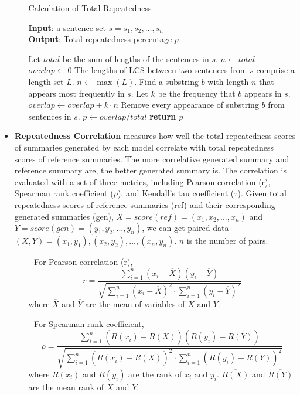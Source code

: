 \begin{itemize}
\begin{itemize}
\begin{algorithm}[th]
\caption{Calculation of Total Repeatedness}
\small
\label{alg:red}
\textbf{Input}: a sentence set $s = {s_{1}, s_{2},...,s_{n}}$\\
\textbf{Output}: Total repeatedness percentage $p$
\begin{algorithmic}[1] 
\STATE Let $total$ be the sum of lengths of the sentences in $s$.
\STATE $n \leftarrow total$
\STATE $overlap \leftarrow 0$
\STATE The lengths of LCS between two sentences from $s$ comprise a length set $L$.
\STATE $n \leftarrow \max(L)$.
\STATE Find a substring $b$ with length $n$ that appears most frequently in $s$.
\STATE Let $k$ be the frequency that $b$ appears in $s$.
\STATE $overlap \leftarrow overlap + k\cdot n$
\STATE Remove every appearance of substring $b$ from sentences in $s$.
\ENDWHILE
\STATE $p \leftarrow overlap/total$
\STATE \textbf{return $p$} 
\end{algorithmic}
\end{algorithm}
\end{itemize}

\item \textbf{Repeatedness Correlation} 
measures how well 
the total repeatedness scores of summaries generated by each model
correlate with total repeatedness scores of reference summaries. 
The more correlative generated summary and reference summary are,
the better generated summary is.
The correlation is evaluated with a set of
three metrics, including Pearson correlation (r),
Spearman rank coefficient ($\rho$), and Kendall's tau coefficient ($\tau$).
Given total repeatedness scores of reference summaries (ref) and 
their corresponding generated summaries (gen),
$X=score(ref)=(x_1, x_2,..., x_n)$ and 
$Y=score(gen)=(y_1, y_2,..., y_n)$, 
we can get paired data $(X,Y)={(x_1, y_1), (x_2, y_2),..., (x_n, y_n)}$.
$n$ is the number of pairs.
\begin{itemize}	
\item[-] For Pearson correlation (r),
\begin{equation}
r = \frac{\sum_{i=1}^{n}(x_i - \overline{X})(y_i - \overline{Y})}
	{\sqrt{\sum_{i=1}^{n}(x_i - \overline{X})^{2}\cdot\sum_{i=1}^{n}(y_i - \overline{Y})^{2}}}
\end{equation}
where $\overline{X}$ and $\overline{Y}$ are the mean of variables of $X$ and $Y$.

\item[-] For Spearman rank coefficient,
\begin{equation}
\rho = \frac{\sum_{i=1}^{n}(R(x_i) - \overline{R(X)})(R(y_i) - \overline{R(Y)})}
	  {\sqrt{\sum_{i=1}^{n}(R(x_i) - \overline{R(X)})^{2}
	  \cdot\sum_{i=1}^{n}(R(y_i)-\overline{R(Y)})^{2}}}
\end{equation}
where $R(x_i)$ and $R(y_i)$ are the rank of $x_i$ and $y_i$.
$\overline{R(X)}$ and $\overline{R(Y)}$ are the mean rank of $X$ and $Y$.


\end{itemize}
\end{itemize}
